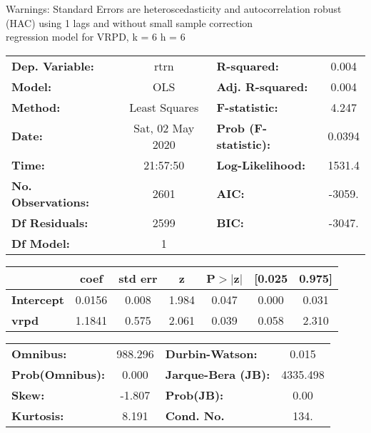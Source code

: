 Warnings: \newline
 [1] Standard Errors are heteroscedasticity and autocorrelation robust (HAC) using 1 lags and without small sample correction\\ 

regression model for VRPD, k = 6 h = 6\begin{center}
\begin{tabular}{lclc}
\toprule
\textbf{Dep. Variable:}    &       rtrn       & \textbf{  R-squared:         } &     0.004   \\
\textbf{Model:}            &       OLS        & \textbf{  Adj. R-squared:    } &     0.004   \\
\textbf{Method:}           &  Least Squares   & \textbf{  F-statistic:       } &     4.247   \\
\textbf{Date:}             & Sat, 02 May 2020 & \textbf{  Prob (F-statistic):} &   0.0394    \\
\textbf{Time:}             &     21:57:50     & \textbf{  Log-Likelihood:    } &    1531.4   \\
\textbf{No. Observations:} &        2601      & \textbf{  AIC:               } &    -3059.   \\
\textbf{Df Residuals:}     &        2599      & \textbf{  BIC:               } &    -3047.   \\
\textbf{Df Model:}         &           1      & \textbf{                     } &             \\
\bottomrule
\end{tabular}
\begin{tabular}{lcccccc}
                   & \textbf{coef} & \textbf{std err} & \textbf{z} & \textbf{P$> |$z$|$} & \textbf{[0.025} & \textbf{0.975]}  \\
\midrule
\textbf{Intercept} &       0.0156  &        0.008     &     1.984  &         0.047        &        0.000    &        0.031     \\
\textbf{vrpd}      &       1.1841  &        0.575     &     2.061  &         0.039        &        0.058    &        2.310     \\
\bottomrule
\end{tabular}
\begin{tabular}{lclc}
\textbf{Omnibus:}       & 988.296 & \textbf{  Durbin-Watson:     } &    0.015  \\
\textbf{Prob(Omnibus):} &   0.000 & \textbf{  Jarque-Bera (JB):  } & 4335.498  \\
\textbf{Skew:}          &  -1.807 & \textbf{  Prob(JB):          } &     0.00  \\
\textbf{Kurtosis:}      &   8.191 & \textbf{  Cond. No.          } &     134.  \\
\bottomrule
\end{tabular}
\end{center}

